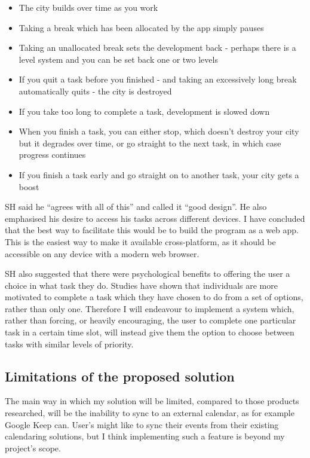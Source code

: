 \documentclass{article}
\begin{document}
\begin{itemize}
	\item The city builds over time as you work
	\item Taking a break which has been allocated by the app simply pauses

	\item Taking an unallocated break sets the development back - perhaps there is a
	      level system and you can be set back one or two levels
	\item If you quit a task before you finished - and taking an excessively long
	      break automatically quits - the city is destroyed
	\item If you take too long to complete a task, development is slowed down
	\item When you finish a task, you can either stop, which doesn't destroy your
	      city but it degrades over time, or go straight to the next task, in which case
	      progress continues
	\item If you finish a task early and go straight on to another task, your city
	      gets a boost
\end{itemize}

SH said he ``agrees with all of this'' and called it ``good design''. He also
emphasised his desire to access his tasks across different devices. I have
concluded that the best way to facilitate this would be to build the program as
a web app. This is the easiest way to make it available cross-platform, as it
should be accessible on any device with a modern web browser.

SH also suggested that there were psychological benefits to offering the user a
choice in what task they do. Studies have shown that individuals are more
motivated to complete a task which they have chosen to do from a set of options,
rather than only one. Therefore I will endeavour to implement a system which,
rather than forcing, or heavily encouraging, the user to complete one particular
task in a certain time slot, will instead give them the option to choose between
tasks with similar levels of priority.

\subsection{Limitations of the proposed solution}
The main way in which my solution will be limited,
compared to those products researched,
will be the inability to sync to an external calendar,
as for example Google Keep can.
User's might like to sync their events from their existing calendaring solutions,
but I think implementing such a feature is beyond my project's scope.
\end{document}
